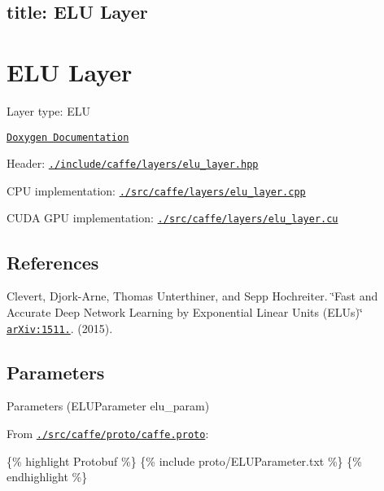 

 \subsection*{title\+: E\+LU Layer }

\section*{E\+LU Layer}


\begin{DoxyItemize}
\item Layer type\+: {\ttfamily E\+LU}
\item \href{http://caffe.berkeleyvision.org/doxygen/classcaffe_1_1ELULayer.html}{\tt Doxygen Documentation}
\item Header\+: \href{https://github.com/BVLC/caffe/blob/master/include/caffe/layers/elu_layer.hpp}{\tt {\ttfamily ./include/caffe/layers/elu\+\_\+layer.hpp}}
\item C\+PU implementation\+: \href{https://github.com/BVLC/caffe/blob/master/src/caffe/layers/elu_layer.cpp}{\tt {\ttfamily ./src/caffe/layers/elu\+\_\+layer.cpp}}
\item C\+U\+DA G\+PU implementation\+: \href{https://github.com/BVLC/caffe/blob/master/src/caffe/layers/elu_layer.cu}{\tt {\ttfamily ./src/caffe/layers/elu\+\_\+layer.cu}}
\end{DoxyItemize}

\subsection*{References}


\begin{DoxyItemize}
\item Clevert, Djork-\/\+Arne, Thomas Unterthiner, and Sepp Hochreiter. \char`\"{}\+Fast and Accurate Deep Network Learning by Exponential Linear Units (\+E\+L\+Us)\char`\"{} \href{https://arxiv.org/abs/1511.07289}{\tt ar\+Xiv\+:1511.}. (2015).
\end{DoxyItemize}

\subsection*{Parameters}


\begin{DoxyItemize}
\item Parameters ({\ttfamily E\+L\+U\+Parameter elu\+\_\+param})
\item From \href{https://github.com/BVLC/caffe/blob/master/src/caffe/proto/caffe.proto}{\tt {\ttfamily ./src/caffe/proto/caffe.proto}}\+:
\end{DoxyItemize}

\{\% highlight Protobuf \%\} \{\% include proto/\+E\+L\+U\+Parameter.\+txt \%\} \{\% endhighlight \%\} 